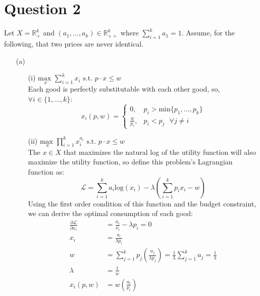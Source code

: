 \documentclass{article}
\newcommand{\R}{\mathbb{R}}
\newcommand{\usmax}[1]{\underset{#1}{\text{max }}}
\newcommand{\loge}[1]{\text{log}\left(#1\right)}
\renewcommand{\L}{\mathcal{L}}
\begin{document}
\section*{Question 2}
Let $X=\R^k_+$ and $(a_1,...,a_k)\in\R^k_{++}$ where $\sum_{i=1}^k a_1=1$. Assume, for the following, that two prices are never identical.
\begin{itemize}
	\item[(a)] 
		\begin{itemize}
			\item[(i)] $\usmax{x}\sum_{i=1}^k x_i\text{ s.t. }p\cdot x\leq w$
				\medskip \\
				Each good is perfectly substitutable with each other good, so, $\forall i\in\{1,...,k\}$:
				\[
					x_i(p,w) =
					\begin{cases}
						0, 				&p_i>\text{min}\{p_1,...,p_k\}	\\
						\frac{w}{p_i},	&p_i<p_j\text{ }\forall j\neq i
					\end{cases}
				\]
				
			\item[(ii)]  $\usmax{x}\prod_{i=1}^k x_i^{a_i}\text{ s.t. }p\cdot x\leq w$
				\medskip \\
				The $x\in X$ that maximizes the natural log of the utility function will also maximize the utility function, so define this problem's Lagrangian function as:
				\[
					\L = \sum_{i=1}^ka_i\loge{x_i} - \lambda\left(\sum_{i=1}^k p_ix_i - w\right)
				\]
				Using the first order condition of this function and the budget constraint, we can derive the optimal consumption of each good:
				\begin{align*}
					\frac{\partial\L}{\partial x_i} &= \frac{a_i}{x_i}-\lambda p_i = 0						\\
												x_i	&= \frac{a_i}{\lambda p_i}								\\
												w 	&= \sum_{j=1}^kp_j\left(\frac{a_j}{\lambda p_j}\right) 
													 = \frac{1}{\lambda}\sum_{j=1}^ka_j = \frac{1}{\lambda}	\\
											\lambda	&= \frac{1}{w}											\\
										x_i(p,w)	&= w\left(\frac{a_i}{p_i}\right)
				\end{align*}
				

\end{itemize}
\end{itemize}
\end{document}
